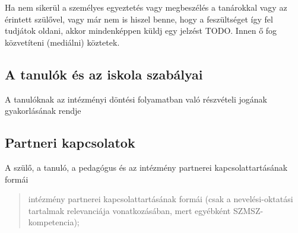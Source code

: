 Ha nem sikerül a személyes egyeztetés vagy megbeszélés a tanárokkal vagy
az érintett szülővel, vagy már nem is hiszel benne, hogy a feszültséget
így fel tudjátok oldani, akkor mindenképpen küldj egy jelzést TODO. Innen ő fog
közvetíteni (mediálni) köztetek.
\subsection{A tanulók és az iskola
  szabályai}\label{a-tanuluxf3k-uxe9s-az-iskola-szabuxe1lyai}

A tanulóknak az intézményi döntési folyamatban való részvételi jogának
gyakorlásának rendje

\subsection{Partneri kapcsolatok}\label{partneri-kapcsolatok}

A szülő, a tanuló, a pedagógus és az intézmény partnerei
kapcsolattartásának formái

\begin{quote}
  intézmény partnerei kapcsolattartásának formái (csak a nevelési-oktatási
  tartalmak relevanciája vonatkozásában, mert egyébként
  SZMSZ-kompetencia);
\end{quote}
